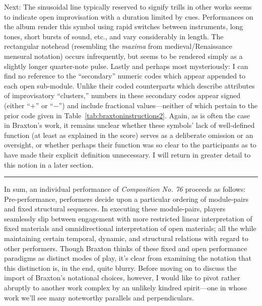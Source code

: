         Next: The sinusoidal line typically reserved to signify trills in other works seems to indicate open improvisation with a duration limited by cues. Performances on the album render this symbol using rapid switches between instruments, long tones, short bursts of sound, etc., and vary considerably in length. The rectangular notehead (resembling the \textit{maxima} from medieval/Renaissance mensural notation) occurs infrequently, but seems to be rendered simply as a slightly longer quarter-note pulse. Lastly and perhaps most mysteriously: I can find no reference to the ``secondary'' numeric codes which appear appended to each open sub-module. Unlike their coded counterparts which describe attributes of improvisatory ``clusters,'' numbers in these secondary codes appear signed (either ``$+$'' or ``$-$'') and include fractional values---neither of which pertain to the prior code given in Table~\ref{tab:braxtoninstructions2}. Again, as is often the case in Braxton's work, it remains unclear whether these symbols' lack of well-defined function (at least as explained in the score) serves as a deliberate omission or an oversight, or whether perhaps their function was so clear to the participants as to have made their explicit definition unnecessary. I will return in greater detail to this notion in a later section.

            \begin{center}
            \vspace{-10pt}
            \noindent\rule{3cm}{0.4pt}
            \end{center}

        In sum, an individual performance of \textit{Composition No. 76} proceeds as follows: Pre-performance, performers decide upon a particular ordering of module-pairs and fixed structural sequences. In executing these module-pairs, players seamlessly slip between engagement with more restricted linear interpretation of fixed materials and omnidirectional interpretation of open materials; all the while maintaining certain temporal, dynamic, and structural relations with regard to other performers. Though Braxton thinks of these fixed and open performance paradigms as distinct modes of play, it's clear from examining the notation that this distinction is, in the end, quite blurry. Before moving on to discuss the import of Braxton's notational choices, however, I would like to pivot rather abruptly to another work complex by an unlikely kindred spirit---one in whose work we'll see many noteworthy parallels and perpendiculars.
    
